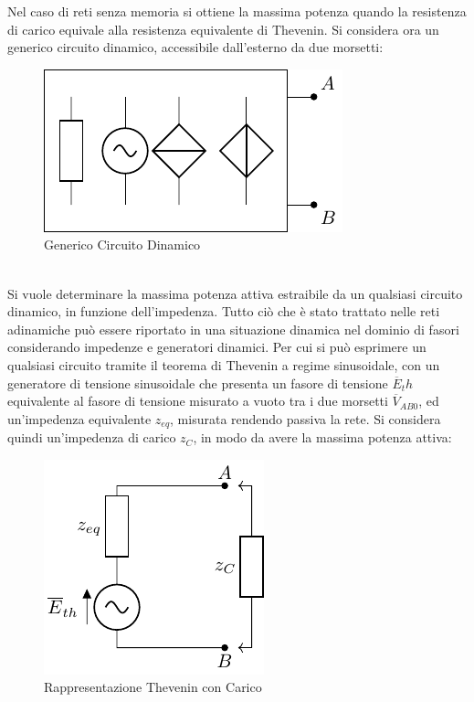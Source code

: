 \documentclass{article}
\numberwithin{equation}{subsection}
\begin{document}
Nel caso di reti senza memoria si ottiene la massima potenza quando la resistenza di carico equivale alla resistenza equivalente di Thevenin. Si considera ora un generico 
circuito dinamico, accessibile dall'esterno da due morsetti:
\begin{figure}[ht]%
    \centering
    \includegraphics{generico-circuito-dinamico.pdf}
    \caption{Generico Circuito Dinamico}
    \label{fig:generico-circuito-dinamico}
\end{figure}
\\
Si vuole determinare la massima potenza attiva estraibile da un qualsiasi circuito dinamico, in funzione dell'impedenza. Tutto ciò che è stato trattato nelle reti adinamiche 
può essere riportato in una situazione dinamica nel dominio di fasori considerando impedenze e generatori dinamici. Per cui si può esprimere un qualsiasi circuito 
tramite il teorema di Thevenin a regime sinusoidale, con un generatore di tensione sinusoidale che presenta un fasore di tensione $\overline{E}_th$ equivalente al fasore 
di tensione misurato a vuoto tra i due morsetti $\overline{V}_{AB0}$, ed un'impedenza equivalente $z_{eq}$, misurata rendendo passiva la rete. Si considera quindi un'impedenza 
di carico $z_C$, in modo da avere la massima potenza attiva:
\begin{figure}[ht]%
    \centering
    \includegraphics{rappresentazione-thevenin-fasori-carico.pdf}
    \caption{Rappresentazione Thevenin con Carico}
    \label{fig:rappresentazione-thevenin-fasori-carico}
\end{figure}
\end{document}
